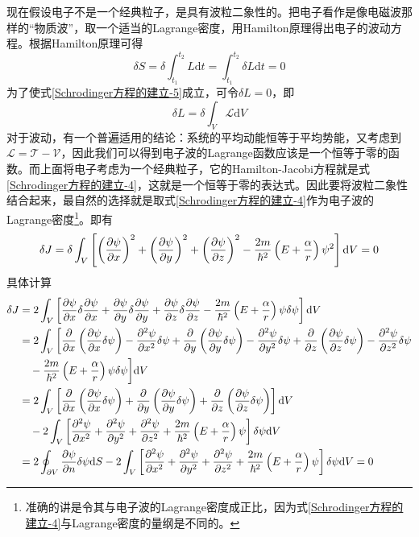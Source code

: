 现在假设电子不是一个经典粒子，是具有波粒二象性的。把电子看作是像电磁波那样的“物质波”，取一个适当的Lagrange密度，用Hamilton原理得出电子的波动方程。根据Hamilton原理可得
\begin{equation}
	\delta S = \delta \int_{t_1}^{t_2} L \mathrm{d}t = \int_{t_1}^{t_2} \delta L \mathrm{d}t = 0
	\label{Schrodinger方程的建立-5}
\end{equation}
为了使式\eqref{Schrodinger方程的建立-5}成立，可令$\delta L = 0$，即
\begin{equation}
	\delta L = \delta \int_V \mathscr{L}\mathrm{d}V
	\label{Schrodinger方程的建立-6}
\end{equation}
对于波动，有一个普遍适用的结论：系统的平均动能恒等于平均势能，又考虑到$\mathscr{L} = \mathscr{T}-\mathscr{V}$，因此我们可以得到电子波的Lagrange函数应该是一个恒等于零的函数。而上面将电子考虑为一个经典粒子，它的Hamilton-Jacobi方程就是式\eqref{Schrodinger方程的建立-4}，这就是一个恒等于零的表达式。因此要将波粒二象性结合起来，最自然的选择就是取式\eqref{Schrodinger方程的建立-4}作为电子波的Lagrange密度\footnote{准确的讲是令其与电子波的Lagrange密度成正比，因为式\eqref{Schrodinger方程的建立-4}与Lagrange密度的量纲是不同的。}。即有
\begin{equation}
	\delta J = \delta \int_V \left[\left(\frac{\partial \psi}{\partial x}\right)^2 + \left(\frac{\partial \psi}{\partial y}\right)^2 + \left(\frac{\partial \psi}{\partial z}\right)^2 - \frac{2m}{\hbar^2}\left(E+\frac{\alpha}{r}\right)\psi^2\right] \mathrm{d}V = 0
	\label{Schrodinger方程的建立-7}
\end{equation}
具体计算
\begin{align*}
	\delta J & = 2\int_V \left[\frac{\partial \psi}{\partial x} \delta \frac{\partial \psi}{\partial x} + \frac{\partial \psi}{\partial y} \delta \frac{\partial \psi}{\partial y} + \frac{\partial \psi}{\partial z} \delta \frac{\partial \psi}{\partial z} - \frac{2m}{\hbar^2}\left(E+\frac{\alpha}{r}\right) \psi\delta \psi\right] \mathrm{d}V \\
	& = 2\int_V \bigg[\frac{\partial}{\partial x}\left(\frac{\partial \psi}{\partial x}\delta \psi\right) - \frac{\partial^2 \psi}{\partial x^2} \delta \psi + \frac{\partial}{\partial y}\left(\frac{\partial \psi}{\partial y}\delta \psi\right) - \frac{\partial^2 \psi}{\partial y^2} \delta \psi + \frac{\partial}{\partial z}\left(\frac{\partial \psi}{\partial z}\delta \psi\right) - \frac{\partial^2 \psi}{\partial z^2} \delta \psi \\
	& \quad {} - \frac{2m}{\hbar^2}\left(E+\frac{\alpha}{r}\right)\psi \delta\psi \bigg] \mathrm{d}V \\
	& = 2\int_V \left[\frac{\partial}{\partial x}\left(\frac{\partial \psi}{\partial x}\delta \psi\right) + \frac{\partial}{\partial y}\left(\frac{\partial \psi}{\partial y}\delta \psi\right) + \frac{\partial}{\partial z}\left(\frac{\partial \psi}{\partial z}\delta \psi\right) \right] \mathrm{d}V \\
	& \quad {} - 2\int_V \left[\frac{\partial^2 \psi}{\partial x^2} + \frac{\partial^2 \psi}{\partial y^2} + \frac{\partial^2 \psi}{\partial z^2} + \frac{2m}{\hbar^2}\left(E+\frac{\alpha}{r}\right)\psi \right] \delta\psi \mathrm{d}V \\
	& = 2\oint_{\partial V} \frac{\partial \psi}{\partial n} \delta \psi \mathrm{d}S - 2\int_V \left[\frac{\partial^2 \psi}{\partial x^2} + \frac{\partial^2 \psi}{\partial y^2} + \frac{\partial^2 \psi}{\partial z^2} + \frac{2m}{\hbar^2}\left(E+\frac{\alpha}{r}\right)\psi \right] \delta\psi \mathrm{d}V = 0
\end{align*}
